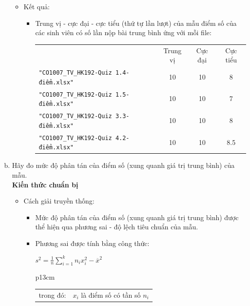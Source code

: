 \documentclass[a4paper]{article}
\theoremstyle{definition}
\begin{document}
\begin{enumerate}[a)]
\begin{itemize}
\begin{itemize}
\begin{center}
\begin{tabular}{p{13cm}}
                \end{tabular}
            \end{center}
        \end{itemize}
        \item Kết quả:
        \begin{itemize}
            \item Trung vị - cực đại - cực tiểu (thứ tự lần lượt) của mẫu điểm số của các sinh viên có số lần nộp bài trung bình ứng với mỗi file:
            \begin{center}
                \begin{tabular}{l c c c}
                     & Trung vị & Cực đại & Cực tiểu\\
                     \texttt{"CO1007\_TV\_HK192-Quiz 1.4-điểm.xlsx"} & 10 & 10 & 8\\ 
                     \texttt{"CO1007\_TV\_HK192-Quiz 1.5-điểm.xlsx"} & 10 & 10 & 7\\ 
                     \texttt{"CO1007\_TV\_HK192-Quiz 3.3-điểm.xlsx"} & 10 & 10 & 8\\ 
                     \texttt{"CO1007\_TV\_HK192-Quiz 4.2-điểm.xlsx"} & 10 & 10 & 8.5\\ 
                \end{tabular}
            \end{center}
        \end{itemize}
    \end{itemize}
    \bf\item Hãy đo mức độ phân tán của điểm số (xung quanh giá trị trung bình) của  mẫu.\\[6pt]
    \bf Kiến thức chuẩn bị\normalfont
    \begin{itemize}
        \item Cách giải truyền thống:
        \begin{itemize}
            \item Mức độ phân tán của điểm số (xung quanh giá trị trung bình) được thể hiện qua phương sai - độ lệch tiêu chuẩn của mẫu.
            \item Phương sai được tính bằng công thức:
            \begin{center}
                $s^2 = \frac{1}{n} \sum \limits_{i=1}^{k} n_i x_i^2 - \overline{x}^2$
                \begin{tabular}{p{13cm}}
                    \begin{tabular}{l l}
                        trong đó: & $x_i$ là điểm số có tần số $n_i$\\

\end{tabular}
\end{tabular}
\end{center}
\end{itemize}
\end{itemize}
\end{enumerate}
\end{document}
